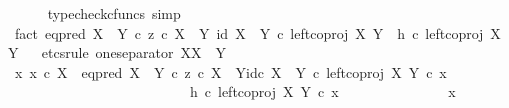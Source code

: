\begin{isabellebody}
\ \ \ \ \isamarkupfalse%
\ {\isacharparenleft}{\kern0pt}typecheck{\isacharunderscore}{\kern0pt}cfuncs{\isacharcomma}{\kern0pt}\ simp{\isacharparenright}{\kern0pt}\isanewline
\isanewline
\ \ \isamarkupfalse%
\ fact{}{\isacharcolon}{\kern0pt}\ {\isachardoublequoteopen}{\isacharparenleft}{\kern0pt}eq{\isacharunderscore}{\kern0pt}pred\ {\isacharparenleft}{\kern0pt}X\ {\isasymCoprod}\ Y{\isacharparenright}{\kern0pt}\ {\isasymcirc}\isactrlsub c\ {\isasymlangle}z\ {\isasymcirc}\isactrlsub c\ {\isasymbeta}\isactrlbsub X\ {\isasymCoprod}\ Y\isactrlesub {\isacharcomma}{\kern0pt}\ id\ {\isacharparenleft}{\kern0pt}X\ {\isasymCoprod}\ Y{\isacharparenright}{\kern0pt}{\isasymrangle}{\isacharparenright}{\kern0pt}\ {\isasymcirc}\isactrlsub c\ left{\isacharunderscore}{\kern0pt}coproj\ X\ Y\ {\isacharequal}{\kern0pt}\ h\ {\isasymcirc}\isactrlsub c\ left{\isacharunderscore}{\kern0pt}coproj\ X\ Y{\isachardoublequoteclose}\isanewline
\ \ \isamarkupfalse%
{\isacharparenleft}{\kern0pt}etcs{\isacharunderscore}{\kern0pt}rule\ one{\isacharunderscore}{\kern0pt}separator{\isacharbrackleft}{\kern0pt}\ X{\isacharequal}{\kern0pt}X{\isacharcomma}{\kern0pt}\ \ Y\ {\isacharequal}{\kern0pt}\ {\isasymOmega}{\isacharbrackright}{\kern0pt}{\isacharparenright}{\kern0pt}\isanewline
\ \ \ \ \isamarkupfalse%
\ {\isachardoublequoteopen}{\isasymAnd}x{\isachardot}{\kern0pt}\ x\ {\isasymin}\isactrlsub c\ X\ {\isasymLongrightarrow}\ {\isacharparenleft}{\kern0pt}{\isacharparenleft}{\kern0pt}eq{\isacharunderscore}{\kern0pt}pred\ {\isacharparenleft}{\kern0pt}X\ {\isasymCoprod}\ Y{\isacharparenright}{\kern0pt}\ {\isasymcirc}\isactrlsub c\ {\isasymlangle}z\ {\isasymcirc}\isactrlsub c\ {\isasymbeta}\isactrlbsub X\ {\isasymCoprod}\ Y\isactrlesub {\isacharcomma}{\kern0pt}id\isactrlsub c\ {\isacharparenleft}{\kern0pt}X\ {\isasymCoprod}\ Y{\isacharparenright}{\kern0pt}{\isasymrangle}{\isacharparenright}{\kern0pt}\ {\isasymcirc}\isactrlsub c\ left{\isacharunderscore}{\kern0pt}coproj\ X\ Y{\isacharparenright}{\kern0pt}\ {\isasymcirc}\isactrlsub c\ x\ {\isacharequal}{\kern0pt}\isanewline
\ \ \ \ \ \ \ \ \ \ \ \ \ \ \ \ \ \ \ \ \ \ \ \ \ \ {\isacharparenleft}{\kern0pt}h\ {\isasymcirc}\isactrlsub c\ left{\isacharunderscore}{\kern0pt}coproj\ X\ Y{\isacharparenright}{\kern0pt}\ {\isasymcirc}\isactrlsub c\ x{\isachardoublequoteclose}\isanewline
\ \ \ \ \isamarkupfalse%
\ {\isacharminus}{\kern0pt}\ \isanewline
\ \ \ \ \ \ \isamarkupfalse%
\ x\isanewline
\ \ \ \ \ \ \isamarkupfalse%

\end{isabellebody}
